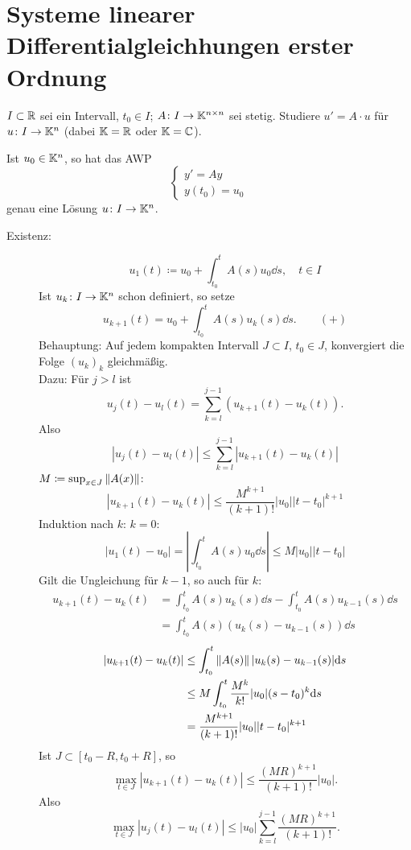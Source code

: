 \section{Systeme linearer Differentialgleichhungen erster Ordnung}
$ I\subset\mathbb{R} $ sei ein Intervall, $ t_0\in I $; $ A\colon I\rightarrow\mathbb{K}^{n\times n} $ sei stetig. Studiere $ u'=A\cdot u $ f\"ur $ u\colon I\rightarrow\mathbb{K}^n $ (dabei $ \mathbb{K}=\mathbb{R} $ oder $ \mathbb{K}=\mathbb{C} $).
\changesection
\begin{satz}
	Ist $ u_0\in\mathbb{K}^n $, so hat das AWP
	\[ \begin{cases}
	y'=Ay\\y(t_0)=u_0
	\end{cases} \]
	genau eine L\"osung $ u\colon I\rightarrow\mathbb{K}^n $.
\end{satz}
\begin{beweis}
	\begin{description}
		\item[Existenz:] \[ u_1(t)\coloneqq u_0+\int_{t_0}^t A(s)u_0\dd s,\quad t\in I \]
		Ist $ u_k\colon I\rightarrow\mathbb{K}^n $ schon definiert, so setze \[ u_{k+1}(t)=u_0+\int_{t_0}^t A(s)u_k(s)\dd s.\qquad (+) \]
		Behauptung: Auf jedem kompakten Intervall $ J\subset I $, $ t_0\in J $, konvergiert die Folge $ (u_k)_k $ gleichm\"a\ss ig.\\
		Dazu: F\"ur $ j>l $ ist
		\[ u_j(t)-u_l(t)=\sum_{k=l}^{j-1}(u_{k+1}(t)-u_k(t)). \]
		Also
		\[ |u_j(t)-u_l(t)|\leq\sum_{k=l}^{j-1}|u_{k+1}(t)-u_k(t)| \]
		$ M\coloneqq\sup_{x\in J}\left\|A(x)\right\| $:
		\[ |u_{k+1}(t)-u_k(t)|\leq\frac{M^{k+1}}{(k+1)!}|u_0||t-t_0|^{k+1} \]
		Induktion nach $ k $: $ k=0 $:
		\[ |u_1(t)-u_0|=\left|\int_{t_0}^t A(s)u_0\dd s\right|\leq M|u_0||t-t_0| \]
		Gilt die Ungleichung f\"ur $ k-1 $, so auch f\"ur $ k $:
		\begin{align*}
		u_{k+1}(t)-u_k(t)&=\int_{t_0}^t A(s)u_k(s)\dd s-\int_{t_0}^t A(s)u_{k-1}(s)\dd s\\
		&=\int_{t_0}^t A(s)(u_k(s)-u_{k-1}(s))\dd s
		\end{align*}
		\begin{align*}
		|u_{k+1}(t)-u_k(t)|&\leq\int_{t_0}^t\left\|A(s)\right\||u_{k}(s)-u_{k-1}(s)|\mathrm d s\\
		&\leq M\int_{t_0}^t\frac{M^k}{k!}|u_0|(s-t_0)^k\mathrm d s\\
		&=\frac{M^{k+1}}{(k+1)!}|u_0||t-t_0|^{k+1}
		\end{align*}
		Ist $ J\subset [t_0-R,t_0+R] $, so \[ \max_{t\in J}|u_{k+1}(t)-u_k(t)|\leq\frac{(MR)^{k+1}}{(k+1)!}|u_0|. \]
		Also
		\[ \max_{t\in J}|u_j(t)-u_l(t)|\leq|u_0|\sum_{k=l}^{j-1}\frac{(MR)^{k+1}}{(k+1)!}. \]

\end{description}
\end{beweis}
